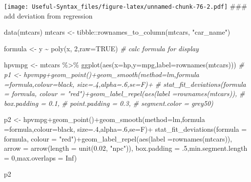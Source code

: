 \documentclass[
]{article}
\newenvironment{Shaded}{\begin{snugshade}}{\end{snugshade}}
\newcommand{\AttributeTok}[1]{\textcolor[rgb]{0.77,0.63,0.00}{#1}}
\newcommand{\CommentTok}[1]{\textcolor[rgb]{0.56,0.35,0.01}{\textit{#1}}}
\newcommand{\ConstantTok}[1]{\textcolor[rgb]{0.00,0.00,0.00}{#1}}
\newcommand{\DecValTok}[1]{\textcolor[rgb]{0.00,0.00,0.81}{#1}}
\newcommand{\FloatTok}[1]{\textcolor[rgb]{0.00,0.00,0.81}{#1}}
\newcommand{\FunctionTok}[1]{\textcolor[rgb]{0.00,0.00,0.00}{#1}}
\newcommand{\NormalTok}[1]{#1}
\newcommand{\OtherTok}[1]{\textcolor[rgb]{0.56,0.35,0.01}{#1}}
\newcommand{\SpecialCharTok}[1]{\textcolor[rgb]{0.00,0.00,0.00}{#1}}
\newcommand{\StringTok}[1]{\textcolor[rgb]{0.31,0.60,0.02}{#1}}
\begin{document}
\texttt{[image: Useful-Syntax\_files/figure-latex/unnamed-chunk-76-2.pdf]}
\#\#\# add deviation from regression

\begin{Shaded}
\begin{Highlighting}[]
\FunctionTok{data}\NormalTok{(mtcars)}
\NormalTok{mtcars }\OtherTok{\textless{}{-}}\NormalTok{ tibble}\SpecialCharTok{::}\FunctionTok{rownames\_to\_column}\NormalTok{(mtcars, }\StringTok{"car\_name"}\NormalTok{)}
\end{Highlighting}
\end{Shaded}

\begin{Shaded}
\begin{Highlighting}[]
\NormalTok{formula }\OtherTok{\textless{}{-}}\NormalTok{ y }\SpecialCharTok{\textasciitilde{}} \FunctionTok{poly}\NormalTok{(x, }\DecValTok{2}\NormalTok{,}\AttributeTok{raw=}\ConstantTok{TRUE}\NormalTok{) }\CommentTok{\# calc formula for display}

\NormalTok{hpvmpg }\OtherTok{\textless{}{-}}\NormalTok{ mtcars }\SpecialCharTok{\%\textgreater{}\%} \FunctionTok{ggplot}\NormalTok{(}\FunctionTok{aes}\NormalTok{(}\AttributeTok{x=}\NormalTok{hp,}\AttributeTok{y=}\NormalTok{mpg,}\AttributeTok{label=}\FunctionTok{rownames}\NormalTok{(mtcars)))}
\CommentTok{\# p1 \textless{}{-} hpvmpg+geom\_point()+geom\_smooth(method=\textquotesingle{}lm\textquotesingle{},formula =formula,colour=\textquotesingle{}black\textquotesingle{}, size=.4,alpha=.6,se=F)+}
\CommentTok{\#   stat\_fit\_deviations(formula = formula, colour = "red")+geom\_label\_repel(aes(label =rownames(mtcars)),}
\CommentTok{\#                   box.padding   = 0.1, }
\CommentTok{\#                   point.padding = 0.3,}
\CommentTok{\#                   segment.color = \textquotesingle{}grey50\textquotesingle{})}

\NormalTok{p2 }\OtherTok{\textless{}{-}}\NormalTok{ hpvmpg}\SpecialCharTok{+}\FunctionTok{geom\_point}\NormalTok{()}\SpecialCharTok{+}\FunctionTok{geom\_smooth}\NormalTok{(}\AttributeTok{method=}\StringTok{\textquotesingle{}lm\textquotesingle{}}\NormalTok{,}\AttributeTok{formula =}\NormalTok{formula,}\AttributeTok{colour=}\StringTok{\textquotesingle{}black\textquotesingle{}}\NormalTok{, }\AttributeTok{size=}\NormalTok{.}\DecValTok{4}\NormalTok{,}\AttributeTok{alpha=}\NormalTok{.}\DecValTok{6}\NormalTok{,}\AttributeTok{se=}\NormalTok{F)}\SpecialCharTok{+}
  \FunctionTok{stat\_fit\_deviations}\NormalTok{(}\AttributeTok{formula =}\NormalTok{ formula, }\AttributeTok{colour =} \StringTok{"red"}\NormalTok{)}\SpecialCharTok{+}\FunctionTok{geom\_label\_repel}\NormalTok{(}\FunctionTok{aes}\NormalTok{(}\AttributeTok{label =}\FunctionTok{rownames}\NormalTok{(mtcars)),}
    \AttributeTok{arrow =} \FunctionTok{arrow}\NormalTok{(}\AttributeTok{length =} \FunctionTok{unit}\NormalTok{(}\FloatTok{0.02}\NormalTok{, }\StringTok{"npc"}\NormalTok{)),}
    \AttributeTok{box.padding =}\NormalTok{ .}\DecValTok{5}\NormalTok{,}\AttributeTok{min.segment.length =} \DecValTok{0}\NormalTok{,}\AttributeTok{max.overlaps =} \ConstantTok{Inf}\NormalTok{)}

\NormalTok{ p2}
\end{Highlighting}
\end{Shaded}
\end{document}
